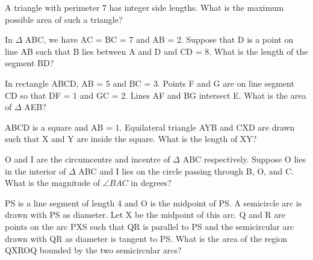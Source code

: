 \item A triangle with perimeter 7 has integer side lengths. What is the maximum possible area of such a triangle?

\item In $\Delta$ ABC, we have AC = BC = 7 and AB = 2. Suppose that D is a point on line AB such that B lies between A and D and CD = 8. What is the length of the segment BD?

\item In rectangle ABCD, AB = 5 and BC = 3. Points F and G are on line segment CD so that DF = 1 and GC = 2. Lines AF and BG intersect E. What is the area of $\Delta$ AEB?

\item ABCD is a square and AB = 1. Equilateral triangle AYB and CXD are drawn such that X and Y are inside the square. What is the length of XY?

\item O and I are the circumcentre and incentre of $\Delta$ ABC respectively. Suppose O lies in the interior of 
$\Delta$ ABC and I lies on the circle passing through B, O, and C. What is the magnitude of $\angle BAC$ in degrees?

\item PS is a line segment of length 4 and O is the midpoint of PS. A semicircle arc is drawn with PS as diameter. Let X be the midpoint of this arc. Q and R are points on the arc PXS such that QR is parallel to PS and the semicircular arc drawn with QR as diameter is tangent to PS. What is the area of the region QXROQ bounded by the two semicircular arcs?
